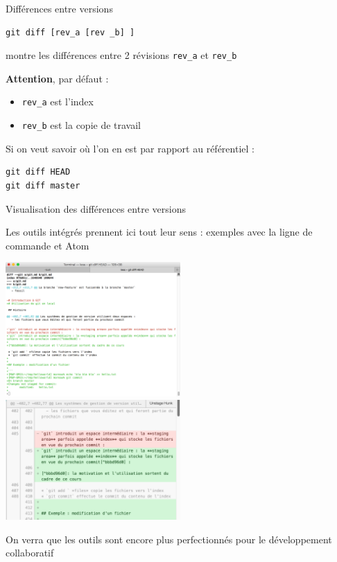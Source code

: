 \begin{frame}[fragile]{%
\protect\hypertarget{diffuxe9rences-entre-versions}{%
Différences entre versions}}

\begin{verbatim}
git diff [rev_a [rev _b] ]
\end{verbatim}

montre les différences entre 2 révisions \texttt{rev\_a} et
\texttt{rev\_b}

\textbf{Attention}, par défaut :

\begin{itemize}
\tightlist
\item
  \texttt{rev\_a} est l’index
\item
  \texttt{rev\_b} est la copie de travail
\end{itemize}

Si on veut savoir où l’on en est par rapport au référentiel :

\begin{verbatim}
git diff HEAD
git diff master
\end{verbatim}

\end{frame}

\begin{frame}{%
\protect\hypertarget{visualisation-des-diffuxe9rences-entre-versions}{%
Visualisation des différences entre versions}}

Les outils intégrés prennent ici tout leur sens : exemples avec la ligne
de commande et Atom

\includegraphics[width=0.5\textwidth]{images/cmd-diff.png}
\includegraphics[width=0.5\textwidth]{images/atom-diff.png}

On verra que les outils sont encore plus perfectionnés pour le
développement collaboratif

\end{frame}

